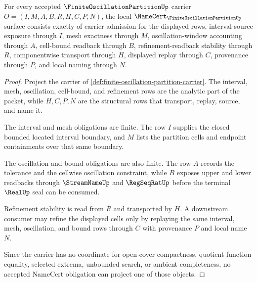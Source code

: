 \begin{theorem}
\label{thm:finite-oscillation-partition-namecert-obligations}
For every accepted $\FiniteOscillationPartitionUp$ carrier $O=(I,M,A,B,R,H,C,P,N)$, the local $\NameCert_{\FiniteOscillationPartitionUp}$ surface consists exactly of carrier admission for the displayed rows, interval-source exposure through $I$, mesh exactness through $M$, oscillation-window accounting through $A$, cell-bound readback through $B$, refinement-readback stability through $R$, componentwise transport through $H$, displayed replay through $C$, provenance through $P$, and local naming through $N$.
\end{theorem}
\begin{proof}
Project the carrier of \autoref{def:finite-oscillation-partition-carrier}. The interval, mesh, oscillation, cell-bound, and refinement rows are the analytic part of the packet, while $H,C,P,N$ are the structural rows that transport, replay, source, and name it.

The interval and mesh obligations are finite. The row $I$ supplies the closed bounded located interval boundary, and $M$ lists the partition cells and endpoint containments over that same boundary.

The oscillation and bound obligations are also finite. The row $A$ records the tolerance and the cellwise oscillation constraint, while $B$ exposes upper and lower readbacks through $\StreamNameUp$ and $\RegSeqRatUp$ before the terminal $\RealUp$ seal can be consumed.

Refinement stability is read from $R$ and transported by $H$. A downstream consumer may refine the displayed cells only by replaying the same interval, mesh, oscillation, and bound rows through $C$ with provenance $P$ and local name $N$.

Since the carrier has no coordinate for open-cover compactness, quotient function equality, selected extrema, unbounded search, or ambient completeness, no accepted NameCert obligation can project one of those objects.
\end{proof}

